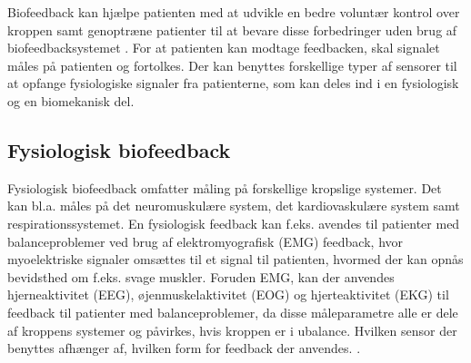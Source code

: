 Biofeedback kan hjælpe patienten med at udvikle en bedre voluntær kontrol over kroppen samt genoptræne patienter til at bevare disse forbedringer uden brug af biofeedbacksystemet \cite{Prentice2007}.  For at patienten kan modtage feedbacken, skal signalet måles på patienten og fortolkes. Der kan benyttes forskellige typer af sensorer til at opfange fysiologiske signaler fra patienterne, som kan deles ind i en fysiologisk og en biomekanisk del.

\subsection{Fysiologisk biofeedback}
Fysiologisk biofeedback omfatter måling på forskellige kropslige systemer. Det kan bl.a. måles på det neuromuskulære system, det kardiovaskulære system samt respirationssystemet.  En fysiologisk feedback kan f.eks. avendes til patienter med balanceproblemer ved brug af elektromyografisk (EMG) feedback, hvor myoelektriske signaler omsættes til et signal til patienten,  hvormed der kan opnås bevidsthed om f.eks. svage muskler. Foruden EMG, kan der anvendes hjerneaktivitet (EEG), øjenmuskelaktivitet (EOG) og hjerteaktivitet (EKG) til feedback til patienter med balanceproblemer, da disse måleparametre alle er dele af kroppens systemer og påvirkes, hvis kroppen er i ubalance. Hvilken sensor der benyttes afhænger af, hvilken form for feedback der anvendes. \cite{Prentice2007}. 



